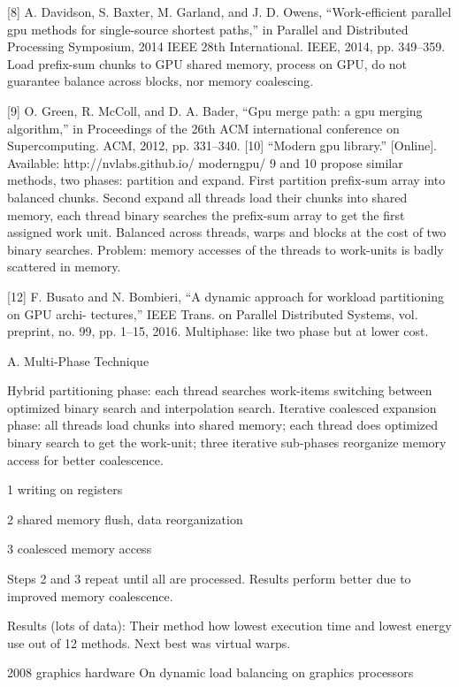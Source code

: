 \documentclass{article}
\begin{document}
[8] A. Davidson, S. Baxter, M. Garland, and J. D. Owens, “Work-efficient parallel gpu methods for single-source shortest paths,” in Parallel and Distributed Processing Symposium, 2014 IEEE 28th International. IEEE, 2014, pp. 349–359. 
Load prefix-sum chunks to GPU shared memory, process on GPU, do not guarantee balance across blocks, nor memory coalescing.

[9] O. Green, R. McColl, and D. A. Bader, “Gpu merge path: a gpu merging algorithm,” in Proceedings of the 26th ACM international conference on Supercomputing. ACM, 2012, pp. 331–340. 
[10] “Modern gpu library.” [Online]. Available: http://nvlabs.github.io/ moderngpu/ 
9 and 10 propose similar methods, two phases: partition and expand.
First partition prefix-sum array into balanced chunks.
Second expand all threads load their chunks into shared memory, each thread binary searches the prefix-sum array to get the first assigned work unit.
Balanced across threads, warps and blocks at the cost of two binary searches.
Problem: memory accesses of the threads to work-units is badly scattered in memory.

[12] F. Busato and N. Bombieri, “A dynamic approach for workload partitioning on GPU archi- tectures,” IEEE Trans. on Parallel Distributed Systems, vol. preprint, no. 99, pp. 1–15, 2016. 
Multiphase: like two phase but at lower cost.

A. Multi-Phase Technique

Hybrid partitioning phase: each thread searches work-items switching between optimized binary search and interpolation search.
Iterative coalesced expansion phase: all threads load chunks into shared memory; each thread does optimized binary search to get the work-unit; three iterative sub-phases reorganize memory access for better coalescence.

1 writing on registers

2 shared memory flush, data reorganization

3 coalesced memory access

Steps 2 and 3 repeat until all are processed.  Results perform better due to improved memory coalescence.

Results (lots of data):
Their method how lowest execution time and lowest energy use out of 12 methods.  Next best was virtual warps.


\cite{Cederman:2008:DLB:1413957.1413967}


2008 graphics hardware
On dynamic load balancing on graphics processors
\end{document}
